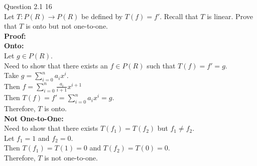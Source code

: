 \documentclass[answers,12pt,addpoints]{exam}
\begin{document}
\begin{questions}
\question Question 2.1 16\\
Let $T: P(R) \to P(R)$ be defined by $T(f) = f'$. Recall that $T$ is linear. Prove that $T$ is onto but not one-to-one.\\
\textbf{Proof:}\\

\textbf{Onto:}\\
Let $g \in P(R)$.\\
Need to show that there exists an $f \in P(R)$ such that $T(f) = f' = g$.\\
Take $g = \sum_{i=0}^n a_i x^i$.\\
Then $f = \sum_{i=0}^n \frac{a_i}{i+1} x^{i+1}$\\
Then $T(f) = f' = \sum_{i=0}^n a_i x^i = g$.\\
Therefore, $T$ is onto.\\

\textbf{Not One-to-One:}\\
Need to show that there exists $T(f_1) = T(f_2)$ but $f_1 \neq f_2$.\\
Let $f_1 = 1$ and $f_2 = 0$.\\
Then $T(f_1) = T(1) = 0$ and $T(f_2) = T(0) = 0$.\\
Therefore, $T$ is not one-to-one.\\


\end{questions}
\end{document}
